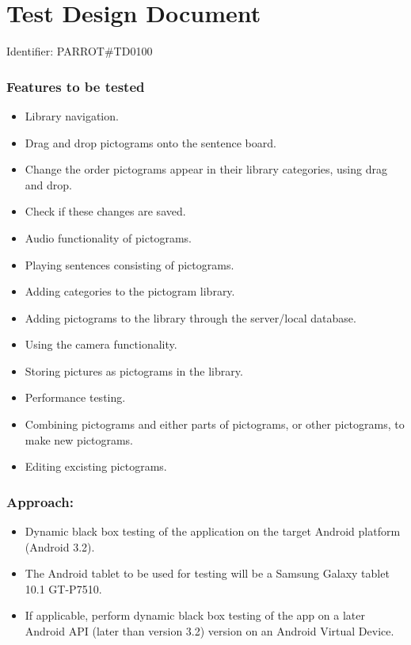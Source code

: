\section{Test Design Document}

Identifier: PARROT\#TD0100

\subsubsection*{Features to be tested}
\begin{itemize}
	\item Library navigation.
	\item Drag and drop pictograms onto the sentence board.
	\item Change the order pictograms appear in their library categories, using drag and drop.
	\item Check if these changes are saved.
	\item Audio functionality of pictograms.
	\item Playing sentences consisting of pictograms.
	\item Adding categories to the pictogram library.
	\item Adding pictograms to the library through the server/local database.
	\item Using the camera functionality.
	\item Storing pictures as pictograms in the library.
	\item Performance testing.
	\item Combining pictograms and either parts of pictograms, or other pictograms, to make new pictograms.
	\item Editing excisting pictograms.
\end{itemize}

\subsubsection*{Approach:}
\begin{itemize}
	\item Dynamic black box testing of the application on the target Android platform (Android 3.2).
	\item The Android tablet to be used for testing will be a Samsung Galaxy tablet 10.1 GT-P7510.
	\item If applicable, perform dynamic black box testing of the app on a later Android API (later than version 3.2) version on an  Android Virtual Device.
\end{itemize}

